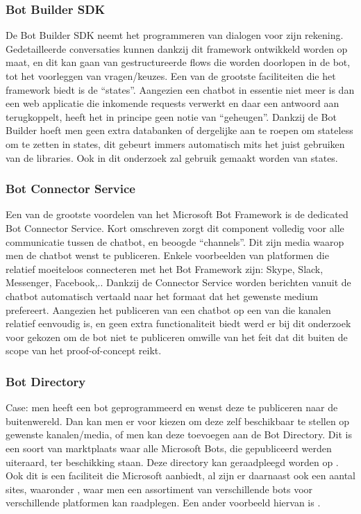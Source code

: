 \subsubsection{Bot Builder SDK}
De Bot Builder SDK neemt het programmeren van dialogen voor zijn rekening. Gedetailleerde conversaties kunnen dankzij dit framework ontwikkeld worden op maat, en dit kan gaan van gestructureerde flows die worden doorlopen in de bot, tot het voorleggen van vragen/keuzes. Een van de grootste faciliteiten die het framework biedt is de “states”. Aangezien een chatbot in essentie niet meer is dan een web applicatie die inkomende requests verwerkt en daar een antwoord aan terugkoppelt, heeft het in principe geen notie van “geheugen”. Dankzij de Bot Builder hoeft men geen extra databanken of dergelijke aan te roepen om stateless om te zetten in states, dit gebeurt immers automatisch mits het juist gebruiken van de libraries. Ook in dit onderzoek zal gebruik gemaakt worden van states. 

\subsubsection{Bot Connector Service}
Een van de grootste voordelen van het Microsoft Bot Framework is de dedicated Bot Connector Service. Kort omschreven zorgt dit component volledig voor alle communicatie tussen de chatbot, en beoogde “channels”. Dit zijn media waarop men de chatbot wenst te publiceren. Enkele voorbeelden van platformen die relatief moeiteloos connecteren met het Bot Framework zijn: Skype, Slack, Messenger, Facebook,.. Dankzij de Connector Service worden berichten vanuit de chatbot automatisch vertaald naar het formaat dat het gewenste medium prefereert. Aangezien het publiceren van een chatbot op een van die kanalen relatief eenvoudig is, en geen extra functionaliteit biedt werd er bij dit onderzoek voor gekozen om de bot niet te publiceren omwille van het feit dat dit buiten de scope van het proof-of-concept reikt. 

\subsubsection{Bot Directory}
Case: men heeft een bot geprogrammeerd en wenst deze te publiceren naar de buitenwereld. Dan kan men er voor kiezen om deze zelf beschikbaar te stellen op gewenste kanalen/media, of men kan deze toevoegen aan de Bot Directory. Dit is een soort van marktplaats waar alle Microsoft Bots, die gepubliceerd werden uiteraard, ter beschikking staan. Deze directory kan geraadpleegd worden op \textcite{Microsoft2019}. Ook dit is een faciliteit die Microsoft aanbiedt, al  zijn er daarnaast ook een aantal sites, waaronder \textcite{botfinderio2019}, waar men een assortiment van verschillende bots voor verschillende platformen kan raadplegen. Een ander voorbeeld hiervan is \textcite{Line2019}. 

